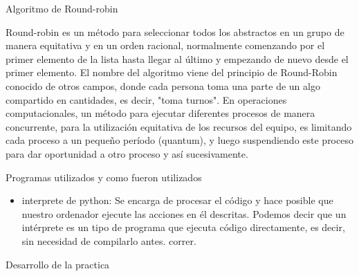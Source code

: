 \documentclass[12pt, a4paper]{report}
\begin{document}
\begin{center}


Algoritmo de Round-robin


\bigskip

Round-robin es un método para seleccionar todos los abstractos en un grupo de manera equitativa y en un orden racional, normalmente comenzando por el primer elemento de la lista hasta llegar al último y empezando de nuevo desde el primer elemento. El nombre del algoritmo viene del principio de Round-Robin conocido de otros campos, donde cada persona toma una parte de un algo compartido en cantidades, es decir, "toma turnos". En operaciones computacionales, un método para ejecutar diferentes procesos de manera concurrente, para la utilización equitativa de los recursos del equipo, es limitando cada proceso a un pequeño período (quantum), y luego suspendiendo este proceso para dar oportunidad a otro proceso y así sucesivamente.
\bigskip


\bigskip




\bigskip
\bigskip

\end{center}




\newpage

\begin{center}
Programas utilizados y como fueron utilizados
\end{center}

\bigskip
\bigskip

\begin{flushleft}
\begin{itemize}
\item interprete de python: Se encarga de procesar el código y hace posible que nuestro ordenador ejecute las acciones en él descritas. Podemos decir que un intérprete es un tipo de programa que ejecuta código directamente, es decir, sin necesidad de compilarlo antes. correr.
\end{itemize}
\end{flushleft}

\newpage

\begin{center}
Desarrollo de la practica
\end{center}

\bigskip
\bigskip
\end{document}
